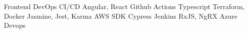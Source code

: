 

\begin{center}
\begin{skills}
                       {Frontend}              {DevOps CI/CD}
              {Angular, React}        {Github Actions}
         {Typescript}            {Terraform, Docker}
              {Jasmine, Jest, Karma}  {AWS SDK}
       {Cypress}               {Jenkins}
                {RxJS, NgRX}            {Azure Devops}
\end{skills}
\end{center}